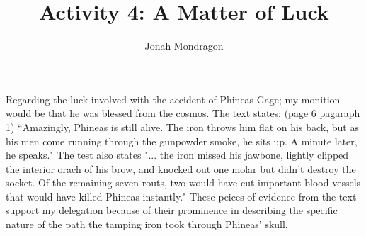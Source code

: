 \documentclass[12pt]{article}
\title{Activity 4: A Matter of Luck}
\author{Jonah Mondragon}
\begin{document}
\maketitle


Regarding the luck involved with the accident of Phineas Gage; my monition would be that
he was blessed from the cosmos. The text states: (page 6 pagaraph 1) ``Amazingly, Phineas
is still alive. The iron throws him flat on his back, but as his men come running 
through the gunpowder smoke, he sits up. A minute later, he speaks." The test also states
"... the iron missed his jawbone, lightly clipped the interior orach of his brow, and 
knocked out one molar but didn't destroy the socket. Of the remaining seven routs, two 
would have cut important blood vessels that would have killed Phineas instantly." These
peices of evidence from the text support my delegation because of their prominence in
describing the specific nature of the path the tamping iron took through Phineas' skull.
\end{document}
